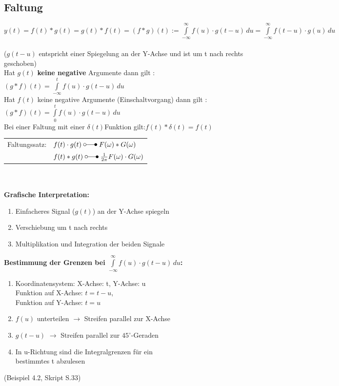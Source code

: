 	\subsection{Faltung}
	$y(t) = f(t)\ast g(t) = g(t) \ast f(t) = \boxed{ (f \ast g)(t) :=
	\int\limits_{-\infty}^\infty f(u) \cdot g(t-u) \, du} =
	\int\limits_{-\infty}^\infty f(t-u) \cdot g(u)\,du $ \\
	\\
	($g(t-u)$ entspricht einer Spiegelung an der Y-Achse und ist um t nach rechts geschoben)\\
	
	Hat $g\left(t\right)$ \textbf{keine negative} Argumente dann gilt :
	$\left(g \ast f \right)\left(t\right)=\int\limits_{-\infty}^t f(u) \cdot
	g(t-u)\,du$\\
	Hat $f\left(t\right)$ keine negative Argumente (Einschaltvorgang) dann gilt :
	$\left(g \ast f \right)\left(t\right)=\int\limits_{0}^t f(u) \cdot
	g(t-u)\,du$\\
	Bei einer Faltung mit einer $\delta\left(t\right)$Funktion
	gilt:$f\left(t\right) \ast \delta\left(t\right) = f\left(t\right)$
	
	\begin{multicols}{2}
		\begin{tabular}{|l | l |}
				\hline
					Faltungssatz: & $f(t)\cdot g(t) \; \laplace \; F(\omega) \ast G(\omega)$ \\
					& $f(t) \ast g(t) \; \laplace \; \frac{1}{2\pi}F(\omega) \cdot G(\omega)$ \\
				\hline
			\end{tabular}\\ \\
		\textbf{Grafische Interpretation:}
		\begin{enumerate}
  			\item Einfacheres Signal ($g(t)$) an der Y-Achse spiegeln
  			\item Verschiebung um t nach rechts
  			\item Multiplikation und Integration der beiden Signale
		\end{enumerate}
		\columnbreak
		\textbf{Bestimmung der Grenzen bei $\int\limits_{-\infty}^\infty f(u) \cdot g(t-u)\,du$:}
		\begin{enumerate}
		  \item Koordinatensystem: X-Achse: t, Y-Achse: u\\ 
		  Funktion auf X-Achse: $t = t - u$, \\
		  Funktion auf Y-Achse: $t = u$
		  \item $f(u)$ unterteilen $\rightarrow$ Streifen parallel zur X-Achse
		  \item $g(t-u)$ $\rightarrow$ Streifen parallel zur $45^{\circ}$-Geraden
		  \item In u-Richtung sind die Integralgrenzen für ein \\ bestimmtes t abzulesen
		\end{enumerate}
	\end{multicols}
	(Beispiel 4.2, Skript S.33)
	

